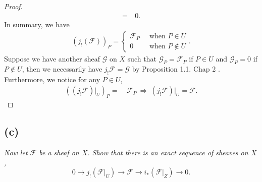 \begin{proof}
\begin{align*}
        =&~ 0.
    \end{align*}
    In summary, we have 
    \begin{align*}
        (j_!(\mathscr F))_P =\begin{cases}
            \mathscr F_P &~ \text{ when } P\in U\\
            0 &~ \text{ when }P\notin U
        \end{cases}.
    \end{align*}
    Suppose we have another sheaf $\mathscr G$ on $X$ such that $\mathscr G_P=\mathscr F_P$ if $P\in U$ and $\mathscr G_P=0$ if $P\notin U$, then we necessarily have $j_!\mathscr F=\mathscr G$ by Proposition 1.1. Chap 2 \cite{hartshorne2013algebraic}. 
    Furthermore, we notice for any $P\in U$,
    \begin{align*}
        ((j_!\mathscr F)\vert_U)_P =&~ \mathscr F_P ~\Rightarrow~ (j_!\mathscr F)\vert_U =\mathscr F.
    \end{align*}
\end{proof}

\subsection{(c)}
\textit{Now let $\mathscr F$ be a sheaf on $X$. Show that there is an exact sequence of sheaves on $X$, \[0\to j_!(\mathscr F\vert_U)\to \mathscr F\to i_{\ast}(\mathscr F\vert_Z)\to 0.\]}

